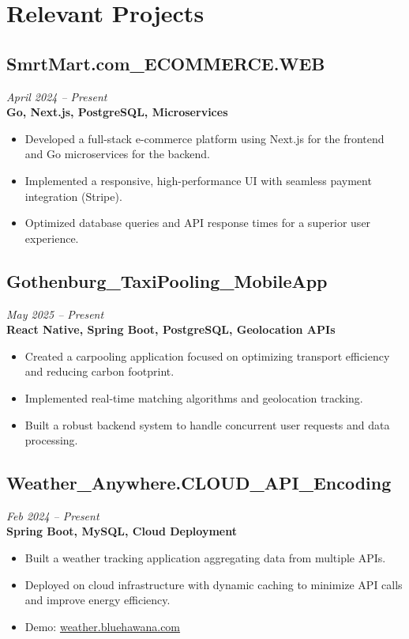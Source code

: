 \documentclass[11pt,a4paper]{article}
\begin{document}
\section*{Relevant Projects}

\subsection{SmrtMart.com\_ECOMMERCE.WEB}
\textit{April 2024 -- Present} \\
\textbf{Go, Next.js, PostgreSQL, Microservices}
\begin{itemize}[noitemsep]
  \item Developed a full-stack e-commerce platform using Next.js for the frontend and Go microservices for the backend.
  \item Implemented a responsive, high-performance UI with seamless payment integration (Stripe).
  \item Optimized database queries and API response times for a superior user experience.
\end{itemize}

\subsection{Gothenburg\_TaxiPooling\_MobileApp}
\textit{May 2025 -- Present} \\
\textbf{React Native, Spring Boot, PostgreSQL, Geolocation APIs}
\begin{itemize}[noitemsep]
  \item Created a carpooling application focused on optimizing transport efficiency and reducing carbon footprint.
  \item Implemented real-time matching algorithms and geolocation tracking.
  \item Built a robust backend system to handle concurrent user requests and data processing.
\end{itemize}

\subsection{Weather\_Anywhere.CLOUD\_API\_Encoding}
\textit{Feb 2024 -- Present} \\
\textbf{Spring Boot, MySQL, Cloud Deployment}
\begin{itemize}[noitemsep]
  \item Built a weather tracking application aggregating data from multiple APIs.
  \item Deployed on cloud infrastructure with dynamic caching to minimize API calls and improve energy efficiency.
  \item Demo: \href{https://weather.bluehawana.com}{weather.bluehawana.com}
\end{itemize}
\end{document}
